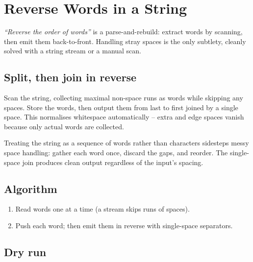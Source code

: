 \section{Reverse Words in a String}
\label{sec:str-reverse-words}


\begin{patternbox}
\emph{``Reverse the order of words''} is a parse-and-rebuild: extract words
by scanning, then emit them back-to-front. Handling stray spaces is the only
subtlety, cleanly solved with a string stream or a manual scan.
\end{patternbox}

\subsection*{Split, then join in reverse}

Scan the string, collecting maximal non-space runs as words while skipping
any spaces. Store the words, then output them from last to first joined by a
single space. This normalises whitespace automatically -- extra and edge
spaces vanish because only actual words are collected.

\begin{ideabox}
Treating the string as a sequence of words rather than characters sidesteps
messy space handling: gather each word once, discard the gaps, and reorder.
The single-space join produces clean output regardless of the input's
spacing.
\end{ideabox}

\subsection*{Algorithm}

\begin{enumerate}
  \item Read words one at a time (a stream skips runs of spaces).
  \item Push each word; then emit them in reverse with single-space
        separators.
\end{enumerate}

\subsection*{Dry run}

